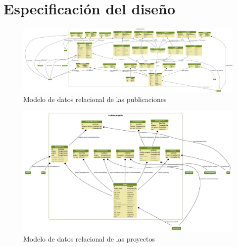 \chapter{Especificación del diseño}\label{chap:design}

\begin{figure}[!htbp]
	\centering
	\includegraphics[angle=-90, scale=0.17]{fig/dbmodel/publications}
	\caption{Modelo de datos relacional de las publicaciones}
	\label{fig:publicationsmodel}
\end{figure}

\begin{figure}[!htbp]
	\centering
	\includegraphics[angle=-90, scale=0.35]{fig/dbmodel/projects}
	\caption{Modelo de datos relacional de las proyectos}
	\label{fig:projectsmodel}
\end{figure}
